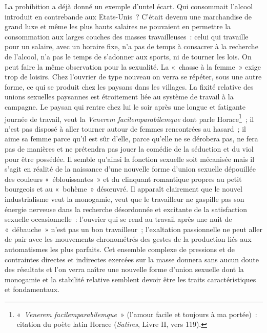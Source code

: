 \documentclass[french,twoside]{book} %
\begin{document}
La prohibition a déjà donné un exemple d’untel écart. Qui consommait l’alcool introduit en contrebande aux Etats-Unis ? C'était devenu une marchandise de grand luxe et même les plus hauts salaires ne pouvaient en permettre la consommation aux larges couches des masses travailleuses : celui qui travaille pour un salaire, avec un horaire fixe, n’a pas de temps à consacrer à la recherche de l’alcool, n’a pas le temps de s’adonner aux sports, ni de tourner les lois. On peut faire la même observation pour la sexualité. La « chasse à la femme » exige trop de loisirs. Chez l’ouvrier de type nouveau on verra se répéter, sous une autre forme, ce qui se produit chez les paysans dans les villages. La fixité relative des unions sexuelles paysannes est étroitement liée au système de travail à la campagne. Le paysan qui rentre chez lui le soir après une longue et fatigante journée de travail, veut la \emph{Venerem facilemparabilemque} dont parle Horace\footnote{« \emph{Venerem facilemparabilemque} » (l’amour facile et toujours à ma portée) : citation du poète latin Horace (\emph{Satires}, Livre II, vers 119).} ; il n’est pas disposé à aller tourner autour de femmes rencontrées au hasard ; il aime sa femme parce qu’il est sûr d’elle, parce qu’elle ne se dérobera pas, ne fera pas de manières et ne prétendra pas jouer la comédie de la séduction et du viol pour être possédée. Il semble qu’ainsi la fonction sexuelle soit mécanisée mais il s’agit en réalité de la naissance d’une nouvelle forme d’union sexuelle dépouillée des couleurs « éblouissantes » et du clinquant romantique propres au petit bourgeois et au « bohème » désœuvré. Il apparaît clairement que le nouvel industrialisme veut la monogamie, veut que le travailleur ne gaspille pas son énergie nerveuse dans la recherche désordonnée et excitante de la satisfaction sexuelle occasionnelle : l’ouvrier qui se rend au travail après une nuit de « débauche » n’est pas un bon travailleur ; l’exaltation passionnelle ne peut aller de pair avec les mouvements chronométrés des gestes de la production liés aux automatismes les plus parfaits. Cet ensemble complexe de pressions et de contraintes directes et indirectes exercées sur la masse donnera sans aucun doute des résultats et l’on verra naître une nouvelle forme d’union sexuelle dont la monogamie et la stabilité relative semblent devoir être les traits caractéristiques et fondamentaux.\par
\end{document}
